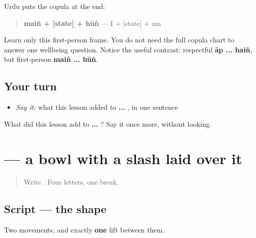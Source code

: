 \begin{grammarlens}[title={Grammar Lens: the verb closes the frame}]
Urdu puts the copula at the end:

\begin{quote}
\textbf{maiṅ + {[}state{]} + hūṅ} — I + {[}state{]} + am
\end{quote}

Learn only this first-person frame. You do not need the full copula chart to answer one wellbeing question. Notice the useful contrast: respectful \textbf{āp ... haiṅ}, but first-person \textbf{maiṅ ... hūṅ}.
\end{grammarlens}

\subsection*{Your turn}
\begin{itemize}
\raggedright
  \item \emph{Say it:} what this lesson added to \textbf{ ... }, in one sentence
\end{itemize}

\begin{tcolorbox}[breakable,colback=teal!4,colframe=teal!35!black,title={Before you move on}]
What did this lesson add to \textbf{ ... }? Say it once more, without looking.
\end{tcolorbox}
\section[\texorpdfstring{\ur{ک} (kāf)}{ک (kāf)}]{ — a bowl with a slash laid over it}

\label{lesson:UR-W04-kaf}



\begin{quote}
Write . Four letters, one break.
\end{quote}

\subsection*{Script — the shape}

\begin{quote}
\end{quote}

Two movements, and exactly \textbf{one} lift between them.

